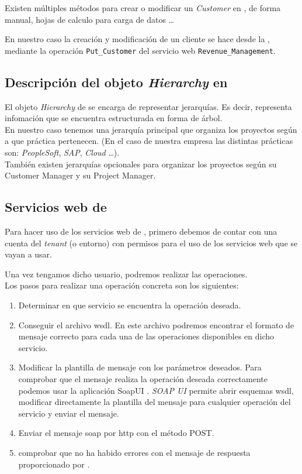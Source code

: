 Existen múltiples métodos para crear o modificar un \textit{Customer} en \wday{}, de forma manual, hojas de calculo para carga de datos \ldots

En nuestro caso la creación y modificación de un cliente se hace desde la \iface{}, 
mediante la operación \verb|Put_Customer| del servicio web \verb|Revenue_Management|.

\subsection{Descripción del objeto \textit{Hierarchy} en \wday{}}

El objeto \textit{Hierarchy} de \wday{} se encarga de representar jerarquías.
Es decir, representa infomación que se encuentra estructurada en forma de árbol.\\

En nuestro caso tenemos una jerarquía principal que organiza los proyectos según a que práctica pertenecen. 
(En el caso de nuestra empresa las distintas prácticas son: \textit{PeopleSoft}, \textit{SAP}, \textit{Cloud} \ldots).\\

También existen jerarquías opcionales para organizar los proyectos según su Customer Manager y su Project Manager.

\subsection{Servicios web de \wday{}}

Para hacer uso de los servicios web de \wday{}, primero debemos de contar con una cuenta del \textit{tenant} (o entorno) con permisos para el uso de los servicios web que se vayan a usar.

Una vez tengamos dicho usuario, podremos realizar las operaciones.\\

Los pasos para realizar una operación concreta son los siguientes:

\begin{enumerate}
	\item Determinar en que servicio se encuentra la operación deseada.
	\item Conseguir el archivo \acrshort{wsdl}. En este archivo podremos encontrar el formato de mensaje correcto para cada una de las operaciones disponibles en dicho servicio.
	\item Modificar la plantilla de mensaje con los parámetros deseados. 
	Para comprobar que el mensaje realiza la operación deseada correctamente podemos usar la aplicación SoapUI \cite{soapui}.
	\textit{SOAP UI} permite abrir esquemas \acrshort{wsdl}, modificar directamente la plantilla del mensaje para cualquier operación del servicio y enviar el mensaje.
	\item Enviar el mensaje \acrshort{soap} por \acrshort{http} con el método POST.
	\item comprobar que no ha habido errores con el mensaje de respuesta proporcionado por \wday.
\end{enumerate}



